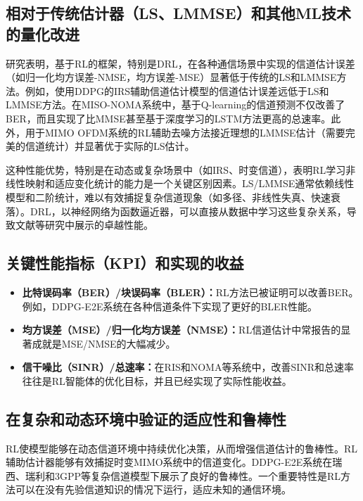 \documentclass[journal]{IEEEtran}
\begin{document}
\subsection{相对于传统估计器（LS、LMMSE）和其他ML技术的量化改进}

研究表明，基于RL的框架，特别是DRL，在各种通信场景中实现的信道估计误差（如归一化均方误差-NMSE，均方误差-MSE）显著低于传统的LS和LMMSE方法\cite{ref1}。例如，使用DDPG的IRS辅助信道估计模型的信道估计误差远低于LS和LMMSE方法\cite{ref1}。在MISO-NOMA系统中，基于Q-learning的信道预测不仅改善了BER，而且实现了比MMSE甚至基于深度学习的LSTM方法更高的总速率\cite{ref15}。此外，用于MIMO OFDM系统的RL辅助去噪方法接近理想的LMMSE估计（需要完美的信道统计）并显著优于实际的LS估计\cite{ref17}。

这种性能优势，特别是在动态或复杂场景中（如IRS、时变信道），表明RL学习非线性映射和适应变化统计的能力是一个关键区别因素。LS/LMMSE通常依赖线性模型和二阶统计\cite{ref1}，难以有效捕捉复杂信道现象（如多径、非线性失真、快速衰落）。DRL，以神经网络为函数逼近器，可以直接从数据中学习这些复杂关系\cite{ref1}，导致文献\cite{ref1}等研究中展示的卓越性能。

\subsection{关键性能指标（KPI）和实现的收益}

\begin{itemize}
\item \textbf{比特误码率（BER）/块误码率（BLER）：}RL方法已被证明可以改善BER\cite{ref13}。例如，DDPG-E2E系统在各种信道条件下实现了更好的BLER性能\cite{ref10}。
\item \textbf{均方误差（MSE）/归一化均方误差（NMSE）：}RL信道估计中常报告的显著成就是MSE/NMSE的大幅减少\cite{ref1}。
\item \textbf{信干噪比（SINR）/总速率：}在RIS和NOMA等系统中，改善SINR和总速率往往是RL智能体的优化目标，并且已经实现了实际性能收益\cite{ref7}。
\end{itemize}

\subsection{在复杂和动态环境中验证的适应性和鲁棒性}

RL使模型能够在动态信道环境中持续优化决策，从而增强信道估计的鲁棒性\cite{ref1}。RL辅助估计器能够有效捕捉时变MIMO系统中的信道变化\cite{ref12}。DDPG-E2E系统在瑞西、瑞利和3GPP等复杂信道模型下展示了良好的鲁棒性\cite{ref10}。一个重要特性是RL方法可以在没有先验信道知识的情况下运行，适应未知的通信环境\cite{ref7}。
\end{document}
